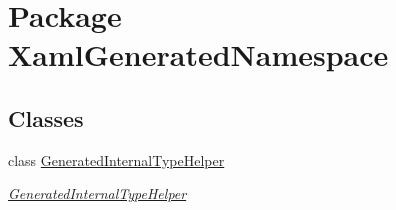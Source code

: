 \hypertarget{namespace_xaml_generated_namespace}{\section{Package Xaml\-Generated\-Namespace}
\label{namespace_xaml_generated_namespace}
}
\subsection*{Classes}
\begin{DoxyCompactItemize}
\item 
class \hyperlink{class_xaml_generated_namespace_1_1_generated_internal_type_helper}{Generated\-Internal\-Type\-Helper}
\begin{DoxyCompactList}\small\item\em \hyperlink{class_xaml_generated_namespace_1_1_generated_internal_type_helper}{Generated\-Internal\-Type\-Helper} \end{DoxyCompactList}\end{DoxyCompactItemize}
